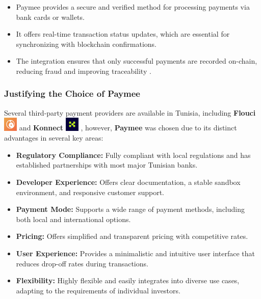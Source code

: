 \begin{itemize}
    \item Paymee provides a secure and verified method for processing payments via bank cards or wallets.
    \item It offers real-time transaction status updates, which are essential for synchronizing with blockchain confirmations.
    \item The integration ensures that only successful payments are recorded on-chain, reducing fraud and improving traceability \cite{Bamakan2020BlockchainPayment}.
\end{itemize}

\subsubsection{Justifying the Choice of Paymee}

Several third-party payment providers are available in Tunisia, including  \textbf{Flouci} \includegraphics[width=0.05\textwidth]{images/icons/flouci_icon.png} and  \textbf{Konnect} \includegraphics[width=0.05\textwidth]{images/icons/konnect_icon.png} , however, \textbf{Paymee} was chosen due to its distinct advantages in several key areas:

\begin{itemize}
  \item \textbf{Regulatory Compliance:} Fully compliant with local regulations and has established partnerships with most major Tunisian banks.
  
  \item \textbf{Developer Experience:} Offers clear documentation, a stable sandbox environment, and responsive customer support.
  
  \item \textbf{Payment Mode:} Supports a wide range of payment methods, including both local and international options.
  
  \item \textbf{Pricing:} Offers simplified and transparent pricing with competitive rates.
  
  \item \textbf{User Experience:} Provides a minimalistic and intuitive user interface that reduces drop-off rates during transactions.
  
  \item \textbf{Flexibility:} Highly flexible and easily integrates into diverse use cases, adapting to the requirements of individual investors.
\end{itemize}

